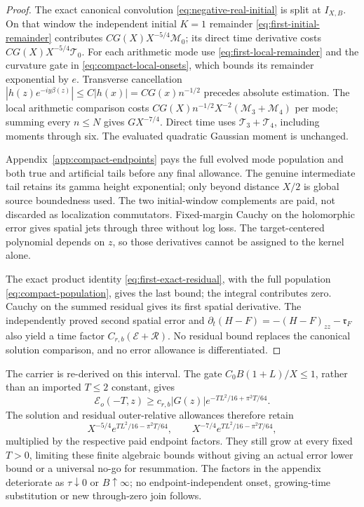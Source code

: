 \documentclass[11pt]{article}
\numberwithin{equation}{section}
\begin{document}
\begin{proof}
The exact canonical convolution \eqref{eq:negative-real-initial}
is split at \(I_{X,B}\). On that window the independent initial
\(K=1\) remainder \eqref{eq:first-initial-remainder} contributes
\(CG(X)X^{-5/4}\mathcal M_0\); its direct time derivative costs
\(CG(X)X^{-5/4}\mathcal T_0\).
For each arithmetic mode use \eqref{eq:first-local-remainder} and
the curvature gate in \eqref{eq:compact-local-onsets}, which bounds
its remainder exponential by \(e\). Transverse cancellation
\(|h(z)e^{-iy\beta(z)}|\le C|h(x)|=CG(x)n^{-1/2}\) precedes
absolute estimation. The local arithmetic comparison costs
\(CG(X)n^{-1/2}X^{-2}(\mathcal M_3+\mathcal M_4)\) per mode;
summing every \(n\le N\) gives \(GX^{-7/4}\).
Direct time uses \(\mathcal T_3+\mathcal T_4\), including moments
through six. The evaluated quadratic Gaussian moment is unchanged.

Appendix~\ref{app:compact-endpoints} pays the full evolved mode
population and both true and artificial tails before any final
allowance. The genuine intermediate tail retains its gamma height
exponential; only beyond distance \(X/2\) is global source
boundedness used. The two initial-window complements are paid, not
discarded as localization commutators. Fixed-margin Cauchy on the
holomorphic error gives spatial jets through three without log loss.
The target-centered polynomial depends on \(z\), so those derivatives
cannot be assigned to the kernel alone.

The exact product identity \eqref{eq:first-exact-residual}, with
the full population \eqref{eq:compact-population}, gives the last
bound; the integral contributes zero. Cauchy on the summed residual
gives its first spatial derivative. The independently proved second
spatial error and \(\partial_t(H-F)=-(H-F)_{zz}-\mathfrak r_F\)
also yield a time factor \(C_{r,b}(\mathcal E+\mathcal R)\).
No residual bound replaces the canonical solution comparison, and
no error allowance is differentiated.
\end{proof}

The carrier is re-derived on this interval. The gate
\(C_0B(1+L)/X\le1\), rather than an imported \(T\le2\) constant,
gives
\begin{equation}
 \mathcal E_o(-T,z)\ge c_{r,b}|G(z)|
       e^{-TL^2/16+\pi^2T/64}.
 \label{eq:compact-carrier-conversion}
\end{equation}
The solution and residual outer-relative allowances therefore retain
\begin{equation}
 X^{-5/4}e^{TL^2/16-\pi^2T/64},\qquad
 X^{-7/4}e^{TL^2/16-\pi^2T/64},
 \label{eq:compact-outer-loss}
\end{equation}
multiplied by the respective paid endpoint factors. They still grow
at every fixed \(T>0\), limiting these finite algebraic bounds without
giving an actual error lower bound or a universal no-go for resummation.
The factors in the appendix deteriorate as \(\tau\downarrow0\) or
\(B\uparrow\infty\); no endpoint-independent onset, growing-time
substitution or new through-zero join follows.
\end{document}
